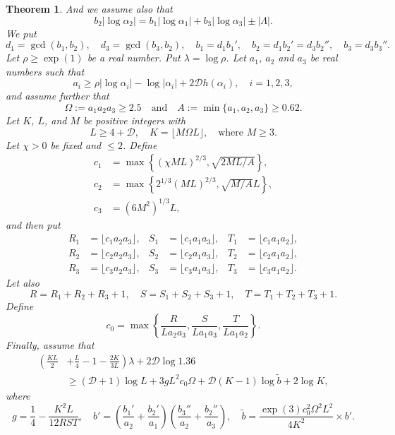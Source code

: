 \documentclass{amsart}
\newtheorem{theorem}{Theorem}
\theoremstyle{definition}
\begin{document}
\begin{theorem}
And we assume also that
$$
b_2|\log\alpha_2| =b_1|\log\alpha_1|  + b_3|\log\alpha_3| \pm |\Lambda|. 
$$
We put
$$
d_1=\gcd(b_1,b_2), \quad d_3=\gcd(b_3,b_2),\quad b_1=d_1b_1',\quad b_2=d_1b_2'=d_3b_2'',\quad b_3=d_3b_3''. 
$$
Let $\rho\ge \exp(1)$ be a real number. Put $\lambda=\log \rho$. Let $a_1$, $a_2$ and $a_3$ be real numbers such that 
$$
a_i\ge \rho|\log \alpha_i| - \log|\alpha_i| + 2\mathcal{D}h(\alpha_i), \quad i=1,2,3,
$$
and assume further that 
$$
\Omega:=a_1a_2a_3\ge 2.5 \quad \mbox{and} \quad A:=\min\{a_1,a_2,a_3\}\ge 0.62.
$$
Let $K$, $L$, and $M$ be positive integers with 
$$
L\ge 4+ \mathcal{D}, \quad K= \lfloor M\Omega L \rfloor, \quad \mbox{where} \,\, M\ge 3. 
$$
Let $\chi>0$ be fixed and $\le 2$. Define 
\begin{align*}
c_1& = \max\left\{(\chi M L)^{2/3}, \sqrt{2ML/A}  \right\},\\
c_2& = \max\left\{2^{1/3}(M L)^{2/3}, \sqrt{M/A}L  \right\},\\
c_3& =(6M^2)^{1/3}L, 
\end{align*}
and then put 
\begin{align*}
R_1&=\lfloor c_1a_2a_3 \rfloor,& S_1&= \lfloor c_1a_1a_3 \rfloor,& T_1&=\lfloor c_1a_1a_2 \rfloor,\\
R_2&=\lfloor c_2a_2a_3 \rfloor,& S_2&= \lfloor c_2a_1a_3 \rfloor,& T_2&=\lfloor c_2a_1a_2 \rfloor,\\ 
R_3&=\lfloor c_3a_2a_3 \rfloor,& S_3&= \lfloor c_3a_1a_3 \rfloor,& T_3&=\lfloor c_3a_1a_2 \rfloor.
\end{align*}
Let also 
$$
R=R_1+R_2+R_3+1, \quad S=S_1+S_2+S_3+1, \quad  T=T_1+T_2+T_3+1.
$$
Define 
$$
c_0=\max\left\{\frac{R}{La_2a_3}, \frac{S}{La_1a_3},\frac{T}{La_1a_2}\right\}. 
$$
Finally, assume that 
\begin{equation}\label{eq:condition1}
\begin{split}
\left(\frac{KL}{2}\right. &\left. + \frac{L}{4}-1 - \frac{2K}{3L}\right)\lambda + 2 \mathcal{D} \log 1.36 \\
&\ge (\mathcal{D}+1) \log L + 3gL^2 c_0 \Omega +\mathcal{D}(K-1)\log\tilde{b}+2\log K,
\end{split}
\end{equation}
where 
$$
g=\frac{1}{4} - \frac{K^2L}{12RST},\quad b'=\left(\frac{b_1'}{a_2}+\frac{b_2'}{a_1}\right)\left(\frac{b_3''}{a_2}+\frac{b_2''}{a_3}\right),
\quad \tilde{b}= \frac{\exp(3)c_0^2\Omega^2 L^2}{4K^2} \times b'.
$$


\end{theorem}
\end{document}
